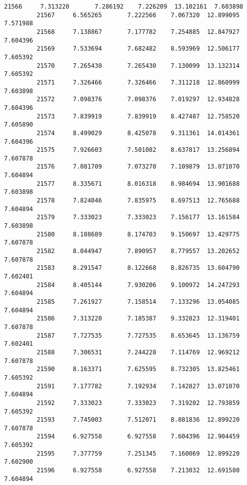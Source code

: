 \documentclass[11pt]{article}
\begin{document}
\begin{Verbatim}[commandchars=\\\{\}]
         21566     7.313220       7.286192    7.226209  13.102161  7.603898   
         21567     6.565265       7.222566    7.067320  12.899095  7.571988   
         21568     7.138867       7.177782    7.254885  12.847927  7.604396   
         21569     7.533694       7.682482    8.593969  12.506177  7.605392   
         21570     7.265430       7.265430    7.130099  13.132314  7.605392   
         21571     7.326466       7.326466    7.311218  12.860999  7.603898   
         21572     7.098376       7.098376    7.019297  12.934828  7.604396   
         21573     7.839919       7.839919    8.427487  12.758520  7.605890   
         21574     8.499029       8.425078    9.311361  14.014361  7.604396   
         21575     7.926603       7.501082    8.637817  13.256894  7.607878   
         21576     7.081709       7.073270    7.109879  13.071070  7.604894   
         21577     8.335671       8.016318    8.984694  13.901688  7.603898   
         21578     7.824046       7.835975    8.697513  12.765688  7.604894   
         21579     7.333023       7.333023    7.156177  13.161584  7.603898   
         21580     8.188689       8.174703    9.150697  13.429775  7.607878   
         21582     8.044947       7.890957    8.779557  13.202652  7.607878   
         21583     8.291547       8.122668    8.826735  13.604790  7.602401   
         21584     8.405144       7.930206    9.100972  14.247293  7.604894   
         21585     7.261927       7.158514    7.133296  13.054085  7.604894   
         21586     7.313220       7.185387    9.332823  12.319401  7.607878   
         21587     7.727535       7.727535    8.653645  13.136759  7.602401   
         21588     7.306531       7.244228    7.114769  12.969212  7.607878   
         21590     8.163371       7.625595    8.732305  13.825461  7.605392   
         21591     7.177782       7.192934    7.142827  13.071070  7.604894   
         21592     7.333023       7.333023    7.319202  12.793859  7.605392   
         21593     7.745003       7.512071    8.881836  12.899220  7.607878   
         21594     6.927558       6.927558    7.604396  12.904459  7.605392   
         21595     7.377759       7.251345    7.160069  12.899220  7.602900   
         21596     6.927558       6.927558    7.213032  12.691580  7.604894   
         

\end{Verbatim}
\end{document}
